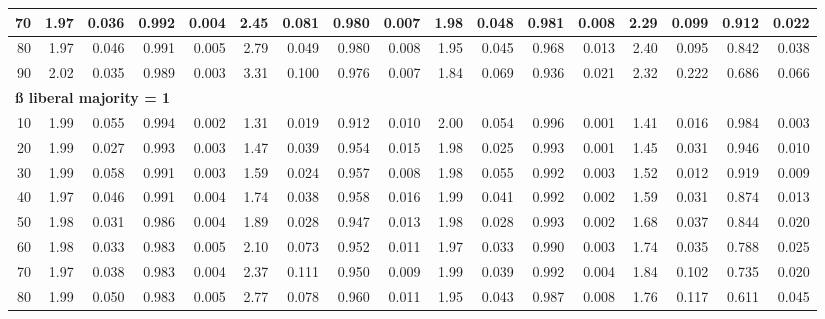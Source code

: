 \documentclass[
]{article}
\begin{document}
\begin{table}[H]
{\begin{tabular}{r|r|r|r|r|r|r|r|r|r|r|r|r|r|r|r|r}
\hline
\hspace{1em}70 & 1.97 & 0.036 & 0.992 & 0.004 & 2.45 & 0.081 & 0.980 & 0.007 & 1.98 & 0.048 & 0.981 & 0.008 & 2.29 & 0.099 & 0.912 & 0.022\\
\hline
\hspace{1em}80 & 1.97 & 0.046 & 0.991 & 0.005 & 2.79 & 0.049 & 0.980 & 0.008 & 1.95 & 0.045 & 0.968 & 0.013 & 2.40 & 0.095 & 0.842 & 0.038\\
\hline
\hspace{1em}90 & 2.02 & 0.035 & 0.989 & 0.003 & 3.31 & 0.100 & 0.976 & 0.007 & 1.84 & 0.069 & 0.936 & 0.021 & 2.32 & 0.222 & 0.686 & 0.066\\
\hline
\multicolumn{17}{l}{\textbf{ß liberal majority = 1}}\\
\hline
\hspace{1em}10 & 1.99 & 0.055 & 0.994 & 0.002 & 1.31 & 0.019 & 0.912 & 0.010 & 2.00 & 0.054 & 0.996 & 0.001 & 1.41 & 0.016 & 0.984 & 0.003\\
\hline
\hspace{1em}20 & 1.99 & 0.027 & 0.993 & 0.003 & 1.47 & 0.039 & 0.954 & 0.015 & 1.98 & 0.025 & 0.993 & 0.001 & 1.45 & 0.031 & 0.946 & 0.010\\
\hline
\hspace{1em}30 & 1.99 & 0.058 & 0.991 & 0.003 & 1.59 & 0.024 & 0.957 & 0.008 & 1.98 & 0.055 & 0.992 & 0.003 & 1.52 & 0.012 & 0.919 & 0.009\\
\hline
\hspace{1em}40 & 1.97 & 0.046 & 0.991 & 0.004 & 1.74 & 0.038 & 0.958 & 0.016 & 1.99 & 0.041 & 0.992 & 0.002 & 1.59 & 0.031 & 0.874 & 0.013\\
\hline
\hspace{1em}50 & 1.98 & 0.031 & 0.986 & 0.004 & 1.89 & 0.028 & 0.947 & 0.013 & 1.98 & 0.028 & 0.993 & 0.002 & 1.68 & 0.037 & 0.844 & 0.020\\
\hline
\hspace{1em}60 & 1.98 & 0.033 & 0.983 & 0.005 & 2.10 & 0.073 & 0.952 & 0.011 & 1.97 & 0.033 & 0.990 & 0.003 & 1.74 & 0.035 & 0.788 & 0.025\\
\hline
\hspace{1em}70 & 1.97 & 0.038 & 0.983 & 0.004 & 2.37 & 0.111 & 0.950 & 0.009 & 1.99 & 0.039 & 0.992 & 0.004 & 1.84 & 0.102 & 0.735 & 0.020\\
\hline
\hspace{1em}80 & 1.99 & 0.050 & 0.983 & 0.005 & 2.77 & 0.078 & 0.960 & 0.011 & 1.95 & 0.043 & 0.987 & 0.008 & 1.76 & 0.117 & 0.611 & 0.045\\

\end{tabular}}
\end{table}
\end{document}
